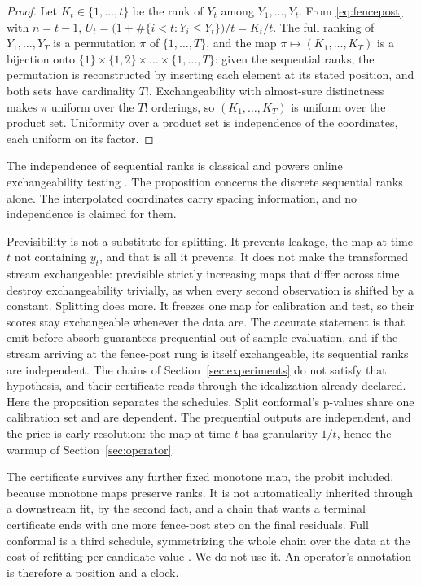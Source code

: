 \documentclass[11pt]{article}
\theoremstyle{remark}
\begin{document}
\begin{proof}
Let $K_t \in \{1, \dots, t\}$ be the rank of $Y_t$ among $Y_1, \dots, Y_t$. From
\eqref{eq:fencepost} with $n = t-1$,
$U_t = \big(1 + \#\{i < t : Y_i \le Y_t\}\big)/t = K_t / t$. The full ranking of
$Y_1, \dots, Y_T$ is a permutation $\pi$ of $\{1, \dots, T\}$, and the map
$\pi \mapsto (K_1, \dots, K_T)$ is a bijection onto
$\{1\} \times \{1,2\} \times \dots \times \{1, \dots, T\}$: given the sequential ranks,
the permutation is reconstructed by inserting each element at its stated position, and
both sets have cardinality $T!$. Exchangeability with almost-sure distinctness makes
$\pi$ uniform over the $T!$ orderings, so $(K_1, \dots, K_T)$ is uniform over the product
set. Uniformity over a product set is independence of the coordinates, each uniform on
its factor.
\end{proof}

The independence of sequential ranks is classical \citep{renyi1962} and powers online
exchangeability testing \citep{vovk2003testing}. The proposition concerns the discrete
sequential ranks alone. The interpolated coordinates carry spacing information, and no
independence is claimed for them.

Previsibility is not a substitute for splitting. It prevents leakage, the map at
time $t$ not containing $y_t$, and that is all it prevents. It does not make the transformed stream exchangeable: previsible
strictly increasing maps that differ across time destroy exchangeability trivially,
as when every second observation is shifted by a constant. Splitting does more. It
freezes one map for calibration and test, so their scores stay exchangeable whenever
the data are. The accurate statement is that emit-before-absorb guarantees prequential
out-of-sample evaluation, and if the stream arriving at the fence-post rung is itself
exchangeable, its sequential ranks are independent. The chains of
Section~\ref{sec:experiments} do not satisfy that hypothesis, and their certificate
reads through the idealization already declared. Here the proposition separates the
schedules. Split
conformal's p-values share one calibration set and are dependent. The prequential
outputs are independent, and the price is early resolution: the map at time $t$ has
granularity $1/t$, hence the warmup of Section~\ref{sec:operator}.

The certificate survives any further fixed monotone map, the probit included, because
monotone maps preserve ranks. It is not automatically inherited through a downstream
fit, by the second fact,
and a chain that wants a terminal certificate ends with one more fence-post step on the
final residuals. Full conformal is a third schedule, symmetrizing the whole chain over
the data at the cost of refitting per candidate value \citep{vovk2005algorithmic}. We do
not use it. An operator's annotation is therefore a position and a clock.
\end{document}
